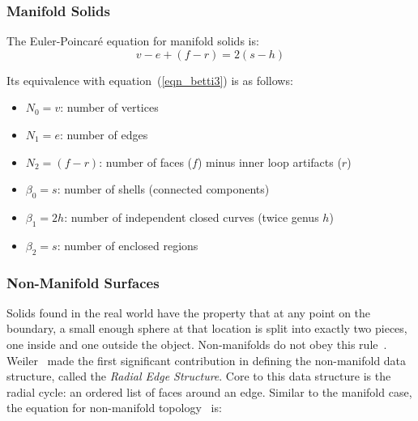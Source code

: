 \documentclass[11pt,a4paper]{article}
\begin{document}
\subsubsection{Manifold Solids}

The Euler-Poincar\'e equation for manifold solids is:
\begin{equation}
  v - e + (f - r) = 2(s - h)
  \label{eqn_manifold}
\end{equation}

Its equivalence with equation~(\ref{eqn_betti3}) is as follows:

\begin{itemize}[noitemsep,topsep=2pt,parsep=2pt,partopsep=2pt,label={}]
\item $N_{0} = v$: number of vertices
\item $N_{1} = e$: number of edges
\item $N_{2} = (f - r)$: number of faces ($f$) minus inner loop artifacts ($r$)
\item $\beta_{0} = s$: number of shells (connected components)
\item $\beta_{1} = 2h$: number of independent closed curves (twice genus $h$)
\item $\beta_{2} = s$: number of enclosed regions
\end{itemize}

%

\subsubsection{Non-Manifold Surfaces}

Solids found in the real world have the property that at any point on the
boundary, a small enough sphere at that location is split into exactly two
pieces, one inside and one outside the object. Non-manifolds do not obey this
rule~\cite{Krishnamurti2002}. Weiler~\cite{Weiler1986} made the first
significant contribution in defining the non-manifold data structure, called
the \emph{Radial Edge Structure}. Core to this data structure is the radial
cycle: an ordered list of faces around an edge. Similar to the manifold case,
the equation for non-manifold topology~\cite{Yamaguchi2002} is:
\end{document}
